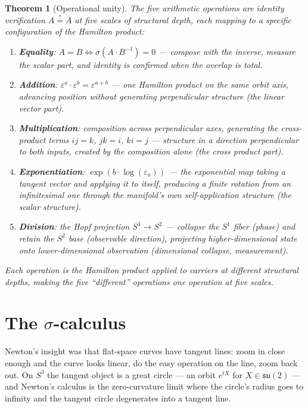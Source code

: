 \documentclass[12pt]{article}
\newtheorem{theorem}{Theorem}[section]
\begin{document}
\begin{theorem}[Operational unity]\label{thm:unity}
    The five arithmetic operations are identity verification $A \stackrel{?}{=} A$ at five scales of structural depth, each mapping to a specific configuration of the Hamilton product:
    \begin{enumerate}
        \item \textbf{Equality}: $A = B \iff \sigma(A \cdot B^{-1}) = 0$ --- compose with the inverse, measure the scalar part, and identity is confirmed when the overlap is total.
        \item \textbf{Addition}: $\varepsilon^a \cdot \varepsilon^b = \varepsilon^{a+b}$ --- one Hamilton product on the same orbit axis, advancing position without generating perpendicular structure (the linear vector part).
        \item \textbf{Multiplication}: composition across perpendicular axes, generating the cross-product terms $ij = k$, $jk = i$, $ki = j$ --- structure in a direction perpendicular to both inputs, created by the composition alone (the cross product part).
        \item \textbf{Exponentiation}: $\exp(b \cdot \log(\varepsilon_a))$ --- the exponential map taking a tangent vector and applying it to itself, producing a finite rotation from an infinitesimal one through the manifold's own self-application structure (the scalar structure).
        \item \textbf{Division}: the Hopf projection $S^3 \to S^2$ --- collapse the $S^1$ fiber (phase) and retain the $S^2$ base (observable direction), projecting higher-dimensional state onto lower-dimensional observation (dimensional collapse, measurement).
    \end{enumerate}
    Each operation is the Hamilton product applied to carriers at different structural depths, making the five ``different'' operations one operation at five scales.
\end{theorem}


\section{The $\sigma$-calculus}

Newton's insight was that flat-space curves have tangent lines: zoom in close enough and the curve looks linear, do the easy operation on the line, zoom back out. On $S^3$ the tangent object is a great circle --- an orbit $e^{tX}$ for $X \in \mathfrak{su}(2)$ --- and Newton's calculus is the zero-curvature limit where the circle's radius goes to infinity and the tangent circle degenerates into a tangent line.
\end{document}
